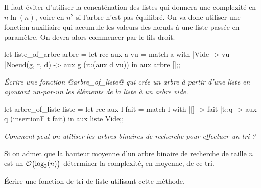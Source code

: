 \begin{Answer}
Il faut éviter d'utiliser la concaténation des listes qui donnera une complexité en $n\ln(n)$, voire en $n^2$ si l'arbre n'est pas équilibré. On va donc utiliser une fonction auxiliaire qui accumule les valeurs des nœuds à une liste passée en paramètre. On devra alors commencer par le fils droit.
\begin{ocaml}
let liste_of_arbre arbre =
  let rec aux a vu =
      match a with
      |Vide -> vu
      |Noeud(g, r, d) -> aux g (r::(aux d vu))
  in aux arbre [];;
\end{ocaml}
\end{Answer}
\begin{Exercise}[title = Remplissage d'un arbre]\it
Écrire une fonction @arbre_of_liste@ qui crée un arbre à partir d'une liste en ajoutant un-par-un les éléments de la liste à un arbre vide.
\end{Exercise}
\begin{Answer}
\begin{ocaml}
let arbre_of_liste liste =
  let rec aux l fait =
      match l with
      |[] -> fait
      |t::q -> aux q (insertionF t fait)
  in aux liste Vide;;
\end{ocaml}
\end{Answer}
\begin{Exercise}[title =Tri]\it
Comment peut-on utiliser les arbres binaires de recherche pour effectuer un tri ?

Si on admet que la hauteur moyenne d'un arbre binaire de recherche de taille $n$ est un ${\cal O}\bigl(\log_2(n)\bigr)$ déterminer la complexité, en moyenne, de ce tri.

Écrire une fonction de tri de liste utilisant cette méthode.
\end{Exercise}
